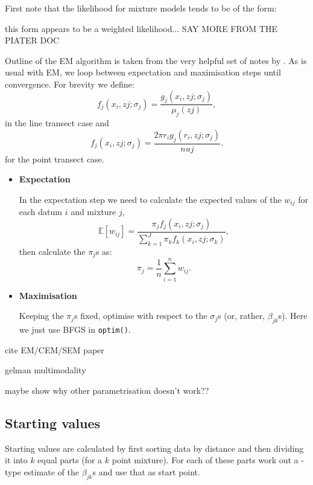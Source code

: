 First note that the likelihood for mixture models tends to be of the form:

this form appears to be a weighted likelihood... SAY MORE FROM THE PIATER DOC

Outline of the EM algorithm is taken from the very helpful set of notes by \cite{piater}. As is usual with EM, we loop between expectation and maximisation steps until convergence. For brevity we define:
\begin{equation*}
f_j(x_i,zj;\sigma_j) =  \frac{g_j(x_i, zj;\sigma_j)}{\mu_j(zj)},
\end{equation*}
in the line transect case and
\begin{equation*}
f_j(x_i,zj;\sigma_j) = \frac{2 \pi r_i g_j(r_i, zj;\sigma_j)}{nuj}.
\end{equation*}
for the point transect case.

\begin{itemize}
\item \textbf{Expectation}

In the expectation step we need to calculate the expected values of the $w_{ij}$ for each datum $i$ and mixture $j$,
\begin{equation*}
\mathbb{E}[w_{ij}] = \frac{\pi_j f_j(x_i,zj;\sigma_j)}{\sum_{k=1}^J \pi_k f_k(x_i,zj;\sigma_k)},
\end{equation*}
then calculate the $\pi_j$s as:
\begin{equation*}
\pi_j=\frac{1}{n} \sum_{i=1}^n w_{ij}.
\end{equation*}

\item \textbf{Maximisation}

Keeping the $\pi_j$s fixed, optimise with respect to the $\sigma_j$s (or, rather, $\beta_{jk}$s). Here we just use BFGS in \texttt{optim()}. 
\end{itemize}



cite EM/CEM/SEM paper

gelman multimodality

maybe show why other parametrisation doesn't work??


\subsection{Starting values}
\label{mmds-starting-vals}
Starting values are calculated by first sorting data by distance and then dividing it into $k$ equal parts (for a $k$ point mixture). For each of these parts work out a \cite{beavers98}-type estimate of the $\beta_{jk}$s and use that as start point. 

